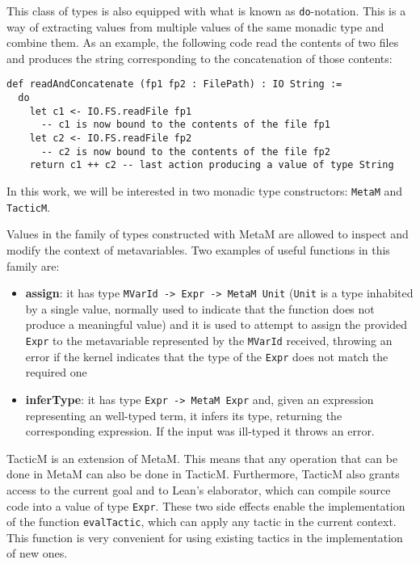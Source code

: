 This class of types is also equipped with what is known as \texttt{do}-notation. This is a way of extracting values from multiple values of the same monadic type and combine them. As an example, the following code read the contents of two files and produces the string corresponding to the concatenation of those contents:

\begin{verbatim}
def readAndConcatenate (fp1 fp2 : FilePath) : IO String :=
  do
    let c1 <- IO.FS.readFile fp1
      -- c1 is now bound to the contents of the file fp1
    let c2 <- IO.FS.readFile fp2
      -- c2 is now bound to the contents of the file fp2
    return c1 ++ c2 -- last action producing a value of type String
\end{verbatim}

In this work, we will be interested in two monadic type constructors: \texttt{MetaM} and \texttt{TacticM}.

Values in the family of types constructed with MetaM are allowed to inspect and modify the context of metavariables. Two examples of useful functions in this family are:

\begin{itemize}
  \item \textbf{assign}: it has type \texttt{MVarId -\textgreater\ Expr -\textgreater\ MetaM Unit} (\texttt{Unit} is a type inhabited by a single value, normally used to indicate that the function does not produce a meaningful value) and it is used to attempt to assign the provided \texttt{Expr} to the metavariable represented by the \texttt{MVarId} received, throwing an error if the kernel indicates that the type of the \texttt{Expr} does not match the required one
  \item \textbf{inferType}: it has type \texttt{Expr -\textgreater\ MetaM Expr} and, given an expression representing an well-typed term, it infers its type, returning the corresponding expression. If the input was ill-typed it throws an error.
\end{itemize}

TacticM is an extension of MetaM. This means that any operation that can be done in MetaM can also be done in TacticM. Furthermore, TacticM also grants access to the current goal and to Lean's elaborator, which can compile source code into a value of type \texttt{Expr}. These two side effects enable the implementation of the function \texttt{evalTactic}, which can apply any tactic in the current context. This function is very convenient for using existing tactics in the implementation of new ones.

